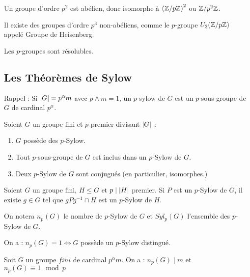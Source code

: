 \documentclass{cours}
\begin{document}
\begin{corollary}
    Un groupe d'ordre $p^{2}$ est abélien, donc isomorphe à $\left(\mathbb{Z}/p\mathbb{Z}\right)^{2}$ ou $\mathbb{Z}/p^{2}\mathbb{Z}$.
\end{corollary}

\begin{remark}
    Il existe des groupes d'ordre $p^{3}$ non-abéliens, comme le $p$-groupe $U_{3}(\mathbb{Z}/p\mathbb{Z})$ appelé Groupe de Heisenberg.
\end{remark}

\begin{corollary}
    Les $p$-groupes sont résolubles. 
\end{corollary}

\subsection{Les Théorèmes de Sylow}
Rappel : Si $\left|G\right| = p^{\alpha}m$ avec $p \wedge m = 1$, un $p$-sylow de $G$ est un $p$-sous-groupe de $G$ de cardinal $p^{\alpha}$.

\begin{theorem}[Sylw]
    Soient $G$ un groupe fini et $p$ premier divisant $\left|G\right|$ :
    \begin{enumerate}
        \item $G$ possède des $p$-Sylow.
        \item Tout $p$-sous-groupe de $G$ est inclus dans un $p$-Sylow de $G$.
        \item Deux $p$-Sylow de $G$ sont conjugués (en particulier, isomorphes.)
    \end{enumerate}
\end{theorem}

\begin{lemma}
    Soient $G$ un groupe fini, $H \leq G$ et $p \mid \left|H\right|$ premier. Si $P$ est un $p$-Sylow de $G$, il existe $g \in G$ tel que $gPg^{-1} \cap H$ est un $p$-Sylow de $H$. 
\end{lemma}

\begin{definition}
    On notera $n_{p}(G)$ le nombre de $p$-Sylow de $G$ et $Syl_{p}(G)$ l'ensemble des $p$-Sylow de $G$. 
\end{definition}
\begin{corollary}
    On a : $n_{p}(G) = 1 \Leftrightarrow G$ possède un $p$-Sylow distingué.
\end{corollary}

\begin{theorem}
    Soit $G$ un groupe $fini$ de cardinal $p^{\alpha}m$. On a : $n_{p}(G) \mid m$ et $ n_{p}(G) \equiv 1 \mod p$
\end{theorem}
\end{document}
